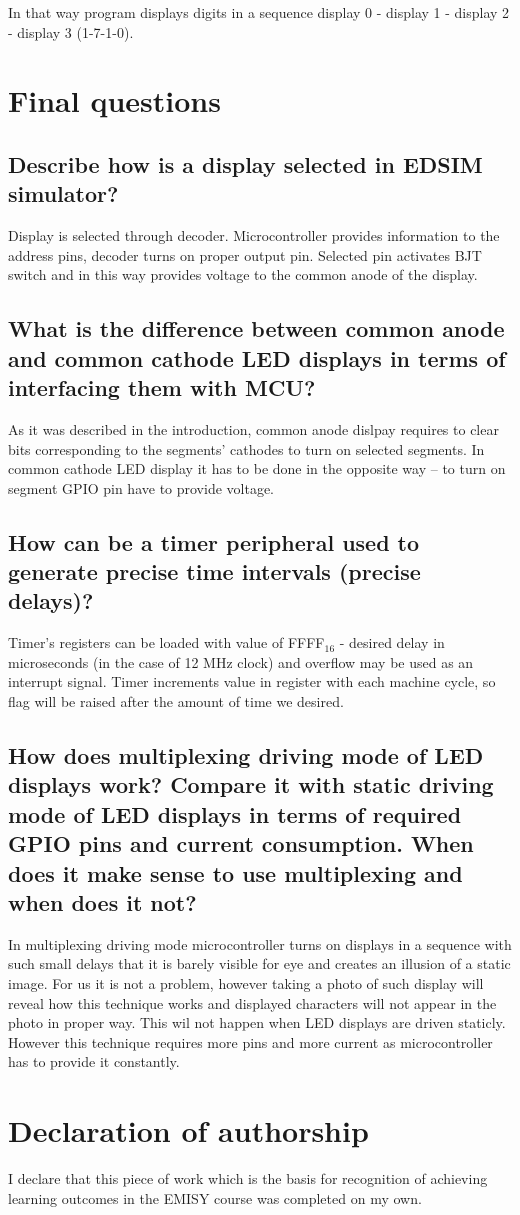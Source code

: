 \documentclass{article}
\begin{document}
In that way program displays digits in a sequence display 0 - display 1 - display 2 - display 3 (1-7-1-0).

\section{Final questions}
\subsection*{Describe how is a display selected in EDSIM simulator?}
Display is selected through decoder. Microcontroller provides information to the address
pins, decoder turns on proper output pin. Selected pin activates BJT switch and in this
way provides voltage to the common anode of the display.

\subsection*{What is the difference between common anode and common cathode LED displays in terms of interfacing them with MCU?}
As it was described in the introduction, common anode dislpay requires to clear bits
corresponding to the segments' cathodes to turn on selected segments. In common
cathode LED display it has to be done in the opposite way -- to turn on segment GPIO pin
have to provide voltage.

\subsection*{How can be a timer peripheral used to generate precise time intervals (precise delays)?}
Timer's registers can be loaded with value of FFFF$_{16}$ - desired delay in microseconds (in the case
of 12 MHz clock) and overflow may be used as an interrupt signal. Timer increments value in
register with each machine cycle, so flag will be raised after the amount of time we desired.

\subsection*{How does multiplexing driving mode of LED displays work? Compare it with static driving mode of LED displays in terms 
of required GPIO pins and current consumption. When does it make sense to use multiplexing and when does it not?}
In multiplexing driving mode microcontroller turns on displays in a sequence with such small delays
that it is barely visible for eye and creates an illusion of a static image. For us it is
not a problem, however taking a photo of such display will reveal how this technique works
and displayed characters will not appear in the photo in proper way. This wil not happen
when LED displays are driven staticly. However this technique requires more pins and more
current as microcontroller has to provide it constantly.

\section*{Declaration of authorship}
I declare that this piece of work which is the basis for recognition of achieving learning outcomes in the EMISY course was completed on my own.
\end{document}
